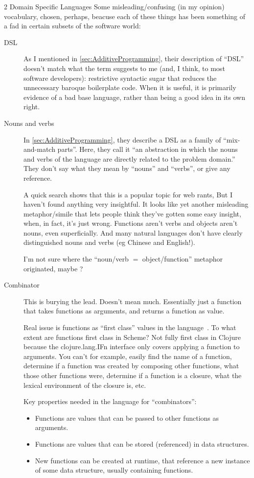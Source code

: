 \documentclass[11pt]{PalisadesLakesBook}
\begin{document}
\begin{plSection}{}
\begin{plSection}{2 Domain Specific Languages}
Some misleading/confusing  (in my opinion)
vocabulary, chosen, perhaps, beacuse 
each of these things has been something of a fad
in certain subsets of the software world:
\begin{description}
\item[DSL]
As I mentioned in \cref{sec:AdditiveProgramming},
their description of ``DSL'' doesn't match 
what the term suggests to me
(and, I think, to most software developers):
restrictive syntactic sugar that reduces 
the unnecessary baroque boilerplate code. 
When it is useful, it is primarily evidence 
of a bad base language,
rather than being a good idea in its own right.

\item[Nouns and verbs]
In \cref{sec:AdditiveProgramming},
they describe a DSL as a family
of ``mix-and-match parts''.
Here, they call it  
``an abstraction in which the nouns and verbs of the language
are directly related to the problem domain.''
They don't say what they mean by ``nouns'' and ``verbs'',
or give any reference.

A quick search shows that this is a popular topic for web rants,
But I haven't found anything very insightful.
It looks like yet another misleading metaphor/simile
that lets people think they've gotten some easy insight,
when, in fact, it's just wrong.
Functions aren't verbs and objects aren't nouns,
even superficially.
And many natural languages don't  have clearly distinguished 
nouns and verbs (eg Chinese and English!).

I'm not sure where the ``noun/verb $=$ object/function'' 
metaphor originated,
maybe ?

\item[Combinator]
This is burying the lead. 
Doesn't mean much.
Essentially just a function that takes functions as arguments,
and returns a function as value.

Real issue is functions as ``first class'' values in the 
language~\cite{wiki:FirstClassValue}.
To what extent are functions first class in Scheme?
Not fully first class in Clojure because the 
{\clojureFont clojure.lang.IFn} interface only covers applying 
a function to arguments.
You can't for example, easily find the name of a function,
determine if a function was created 
by composing other functions,
what those other functions were,
determine if a function is a closure,
what the lexical environment of the closure is,
etc.

Key properties needed in the language for ``combinators'':
\begin{itemize}
\item Functions are values that can be passed to other functions
as arguments.
\item Functions are values that can be stored (referenced)
in data structures.
\item New functions can be created at runtime, that reference
a new instance of some data structure,
usually containing functions.
\end{itemize}
\end{description}


\end{plSection}
\end{plSection}
\end{document}
